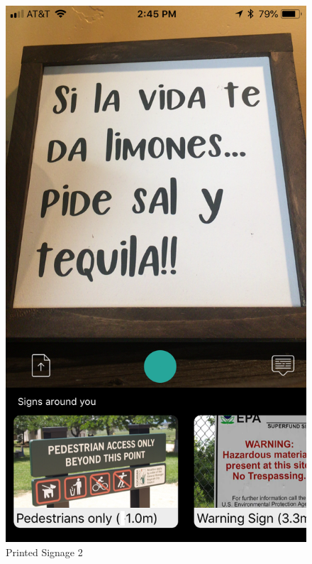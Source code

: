 \documentclass[12pt]{article}
\begin{document}
 \begin{figure} [H]
\centering
\begin{minipage}{.5\textwidth}
  \centering
  \includegraphics[width=0.9\linewidth]{media/case4.png}
  \caption{Printed Signage 2}
  \label{fig:case4in}
\end{minipage}%
\begin{minipage}{.5\textwidth}
  \centering

\end{minipage}
\end{figure}
\end{document}
